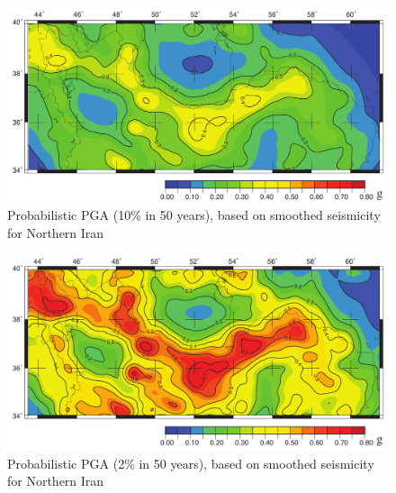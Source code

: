 \begin{figure} [H]
\centering
\includegraphics[scale=0.8]{figures/pdf/Figure5.pdf} 
\caption{Probabilistic PGA (10\% in 50 years), based on smoothed seismicity for Northern Iran }
\label{fig:10percent}
\end{figure}



\begin{figure} [H]
\centering
\includegraphics[scale=0.8]{figures/pdf/Figure6.pdf} 
\caption{Probabilistic PGA (2\% in 50 years), based on smoothed seismicity for Northern Iran}
\label{fig:2percent}
\end{figure}

